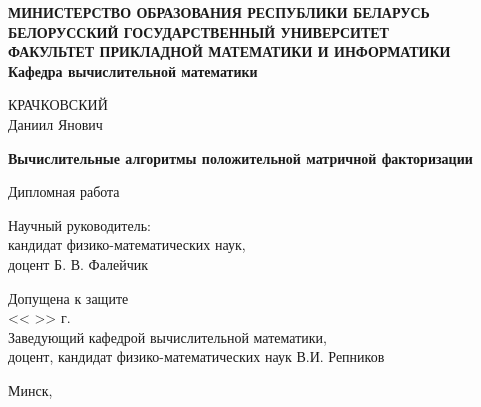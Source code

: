 \begin{titlepage}

  \begin{center}
    \textbf{МИНИСТЕРСТВО ОБРАЗОВАНИЯ РЕСПУБЛИКИ БЕЛАРУСЬ} \\
    \textbf{БЕЛОРУССКИЙ ГОСУДАРСТВЕННЫЙ УНИВЕРСИТЕТ} \\
    \textbf{ФАКУЛЬТЕТ ПРИКЛАДНОЙ МАТЕМАТИКИ И ИНФОРМАТИКИ} \\
    \textbf{Кафедра вычислительной математики}
  \end{center}

  \vfill

  \begin{center}
    КРАЧКОВСКИЙ \\
    Даниил Янович
  \end{center}

  \begin{center}
    \textbf{Вычислительные алгоритмы положительной матричной факторизации}
  \end{center}

  \vspace{2.5em}

  \begin{center}
    Дипломная работа
  \end{center}

  \vfill

  \begin{flushright}
    \begin{minipage}{0.5 \linewidth}
      Научный руководитель: \\
      кандидат физико-математических наук, \\
      доцент Б. В. Фалейчик
    \end{minipage}
  \end{flushright}

  \vspace{1cm}

  \begin{flushleft}
    Допущена к защите \\
    << \underline{\hspace{1cm}} >> \underline{\hspace{3cm}} \the\year г. \\
    Заведующий кафедрой вычислительной математики, \\
    доцент, кандидат физико-математических наук В.И. Репников
  \end{flushleft}

  \vspace{0.5cm}

  \begin{center}
    Минск, \the\year
  \end{center}

\end{titlepage}
